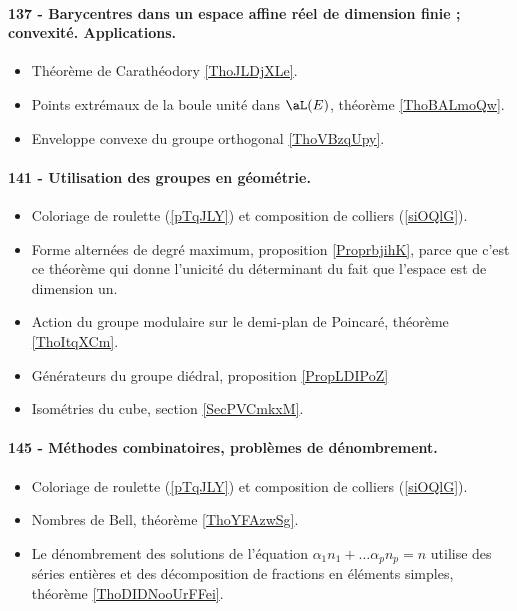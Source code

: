 \paragraph{137 - Barycentres dans un espace affine réel de dimension finie ; convexité. Applications.}
\begin{itemize}
    \item Théorème de Carathéodory \ref{ThoJLDjXLe}.
    \item Points extrémaux de la boule unité dans \( \aL(E)\), théorème \ref{ThoBALmoQw}.
    \item Enveloppe convexe du groupe orthogonal \ref{ThoVBzqUpy}.
\end{itemize}
\paragraph{141 - Utilisation des groupes en géométrie.}
\begin{itemize}
    \item Coloriage de roulette (\ref{pTqJLY}) et composition de colliers (\ref{siOQlG}).
    \item Forme alternées de degré maximum, proposition \ref{ProprbjihK}, parce que c'est ce théorème qui donne l'unicité du déterminant du fait que l'espace est de dimension un.
    \item Action du groupe modulaire sur le demi-plan de Poincaré, théorème \ref{ThoItqXCm}.
    \item Générateurs du groupe diédral, proposition \ref{PropLDIPoZ}
    \item Isométries du cube, section \ref{SecPVCmkxM}.
\end{itemize}
\paragraph{145 - Méthodes combinatoires, problèmes de dénombrement.}
\begin{itemize}
    \item Coloriage de roulette (\ref{pTqJLY}) et composition de colliers (\ref{siOQlG}).
    \item Nombres de Bell, théorème \ref{ThoYFAzwSg}.
    \item Le dénombrement des solutions de l'équation \( \alpha_1 n_1+\ldots \alpha_pn_p=n\) utilise des séries entières et des décomposition de fractions en éléments simples, théorème \ref{ThoDIDNooUrFFei}.
\end{itemize}
